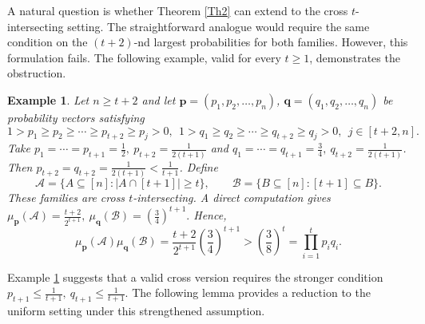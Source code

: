 \documentclass[11pt]{article}
\newtheorem{example}{Example}[section]
\begin{document}
A natural question is whether Theorem \ref{Th2} can extend to the cross $t$-intersecting setting. The straightforward analogue would require the same condition on the $(t+2)$-nd  largest probabilities for both families. However, this formulation fails. The following example, valid for every $t\ge 1$, demonstrates the obstruction.
\begin{example}\label{E1}
Let $n\geq t+2$ and let  $\textbf{p}=(p_1,p_2,\ldots,p_n)$,  $\textbf{q}=(q_1,q_2,\ldots,q_n)$ be probability vectors satisfying 
 $$1 > p_1 \ge p_2 \ge \cdots \ge p_{t+2}\geq p_j > 0, \ \ 1 > q_1 \ge q_2 \ge \cdots \ge q_{t+2}\geq q_j > 0, \ \ j\in [t+2, n].$$
 Take
$
p_1=\cdots=p_{t+1}=\frac{1}{2},\ p_{t+2}=\frac{1}{2(t+1)}$ and $
q_1=\cdots=q_{t+1}=\frac{3}{4},\ q_{t+2}=\frac{1}{2(t+1)}$.
Then $p_{t+2}=q_{t+2}=\frac{1}{2(t+1)}<\frac{1}{t+1}$.  Define
$$
\mathcal{A}=\{A\subseteq[n]:|A\cap[t+1]|\ge t\},\qquad
\mathcal{B}=\{B\subseteq[n]:[t+1]\subseteq B\}.
$$
These families are cross $t$-intersecting. A direct computation gives
$
\mu_{\mathbf{p}}(\mathcal{A})=\frac{t+2}{2^{t+1}},\ 
\mu_{\mathbf{q}}(\mathcal{B})=\left(\frac34\right)^{t+1}.
$
Hence,
$$
\mu_{\mathbf{p}}(\mathcal{A})\mu_{\mathbf{q}}(\mathcal{B})
=
\frac{t+2}{2^{t+1}}\left(\frac34\right)^{t+1}
>
\left(\frac38\right)^t
=
\prod_{i=1}^t p_iq_i.
$$
\end{example}

Example \ref{E1} suggests that a valid cross version requires the stronger condition
$
p_{t+1}\le \frac{1}{t+1},~ q_{t+1}\le \frac{1}{t+1}.
$
The following  lemma provides a reduction to  the uniform  setting under this strengthened assumption.
\end{document}
